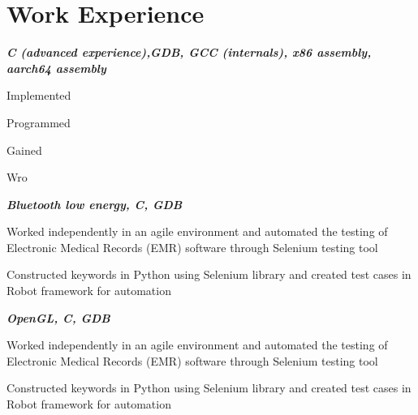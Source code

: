 \documentclass[letterpaper, 10pt]{deedy-resume} %
\begin{document}
\begin{minipage}[t]{0.65\textwidth} %

\section{Work Experience}

\textit{\bf{C (advanced experience),GDB, GCC (internals), x86 assembly, aarch64 assembly}}
\vspace{\topsep} %
\begin{tightitemize}
\item Implemented 
\item Programmed 
\item Gained 
\item Wro
\end{tightitemize}
\sectionspace 

\textit{\bf{Bluetooth low energy, C, GDB}}
\vspace{\topsep} %
\begin{tightitemize}
\item Worked independently in an agile environment and automated the testing of Electronic Medical Records (EMR) software through Selenium testing tool
\item Constructed keywords in Python using Selenium library and created test cases in Robot framework for automation
\end{tightitemize}
\sectionspace

\textit{\bf{OpenGL, C, GDB}}
\vspace{\topsep} %
\begin{tightitemize}
\item Worked independently in an agile environment and automated the testing of Electronic Medical Records (EMR) software through Selenium testing tool
\item Constructed keywords in Python using Selenium library and created test cases in Robot framework for automation
\end{tightitemize}
\sectionspace


\end{minipage}
\end{document}
